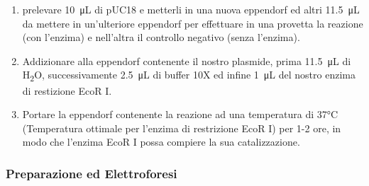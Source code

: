\begin{enumerate}

	\item prelevare \SI{10}{\micro\liter} di pUC18 e metterli in una nuova eppendorf
	ed altri \SI{11.5}{\micro\liter} da mettere in un'ulteriore eppendorf per effettuare in
	una provetta la reazione (con l'enzima) e nell'altra il controllo negativo (senza l'enzima).

	\item Addizionare alla eppendorf contenente il nostro plasmide,
	prima \SI{11.5}{\micro\liter} di H\textsubscript{2}O, successivamente
	\SI{2.5}{\micro\liter} di buffer 10X ed infine \SI{1}{\micro\liter} del nostro enzima di restizione EcoR I.

	\item Portare la eppendorf contenente la reazione ad una temperatura di 37°C
	(Temperatura ottimale per l'enzima di restrizione EcoR I) per 1-2 ore,
	in modo che l'enzima EcoR I possa compiere la sua catalizzazione.

\end{enumerate}

\subsubsection{Preparazione ed Elettroforesi}


